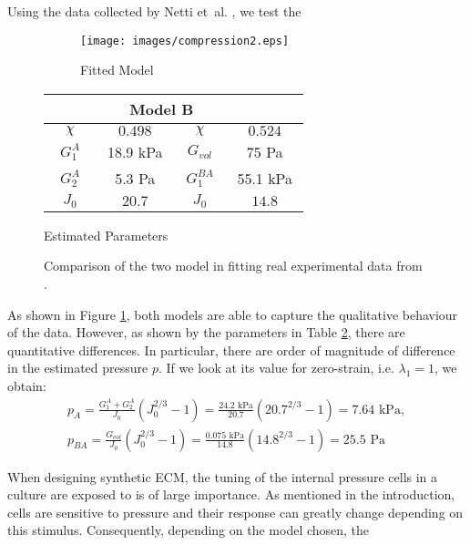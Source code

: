 Using the data collected by Netti et~al. \cite{Netti}, we test the 
\begin{figure}[h]
	\hspace{-8mm}
	\begin{subfigure}{0.62\textwidth}
		\hspace{2mm}
		\texttt{[image: images/compression2.eps]}
		\caption{Fitted Model}
		\label{fit}
	\end{subfigure}
	\begin{subtable}{0.375\textwidth}
			\begin{tabular}{c | c ||c| c }		
				\hline\addlinespace[2pt]
				 \multicolumn{2}{c||}{Model A} &  \multicolumn{2}{c}{Model B}\\[0.5mm]
				\hline\addlinespace[2pt]
				$\quad \chi\quad$ & $\quad0.498\quad$ &$\quad \chi\quad$&$\quad0.524\quad$\\[0.5mm]
				$G^A_1$ & 18.9 kPa&$G_{vol}$&75 Pa\\[0.5mm]
				$G^A_2$ & 5.3 Pa&$G^{BA}_{1}$& 55.1 kPa\\[0.5mm]
				$J_0$ & $20.7$&  $J_0$&$14.8$\\[0.5mm]
				\hline
			\end{tabular}
		\caption{Estimated Parameters}
		\label{param}
	\end{subtable}
\caption{Comparison of the two model in fitting real experimental data from \cite{Netti}.}		
\end{figure}

As shown in Figure \ref{fit}, both models are able to capture the qualitative behaviour of the data. However, as shown by the parameters in Table \ref{param}, there are quantitative differences. In particular, there are order of magnitude of difference in the estimated pressure $p$. If we look at its value for zero-strain, i.e. $\lambda_1=1$, we obtain: 
\begin{gather}
p_A = \frac{G^A_1+G^A_2}{J_0}(J_0^{2/3}-1) = \frac{24.2 \text{ kPa}}{20.7}(20.7^{2/3}-1) = 7.64 \text{ kPa},\\
p_{BA} = \frac{G_{vol}}{J_0}(J_0^{2/3}-1) = \frac{0.075 \text{ kPa}}{14.8}(14.8^{2/3}-1) = 25.5 \text{ Pa}
\end{gather}

When designing synthetic ECM, the tuning of the internal pressure cells in a culture are exposed to is of large importance. As mentioned in the introduction, cells are sensitive to pressure and their response can greatly change depending on this stimulus. Consequently, depending on the model chosen, the
